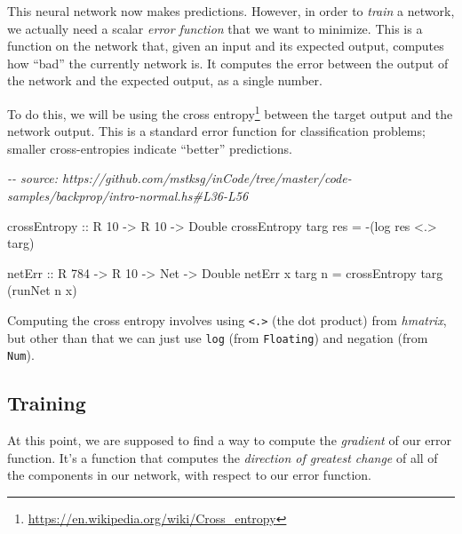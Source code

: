 \documentclass[]{article}
\newenvironment{Shaded}{}{}
\newcommand{\CommentTok}[1]{\textcolor[rgb]{0.38,0.63,0.69}{\textit{#1}}}
\newcommand{\DataTypeTok}[1]{\textcolor[rgb]{0.56,0.13,0.00}{#1}}
\newcommand{\DecValTok}[1]{\textcolor[rgb]{0.25,0.63,0.44}{#1}}
\newcommand{\FunctionTok}[1]{\textcolor[rgb]{0.02,0.16,0.49}{#1}}
\newcommand{\NormalTok}[1]{#1}
\newcommand{\OperatorTok}[1]{\textcolor[rgb]{0.40,0.40,0.40}{#1}}
\newcommand{\OtherTok}[1]{\textcolor[rgb]{0.00,0.44,0.13}{#1}}
\renewcommand{\href}[2]{#2\footnote{\url{#1}}}
\begin{document}
This neural network now makes predictions. However, in order to \emph{train} a
network, we actually need a scalar \emph{error function} that we want to
minimize. This is a function on the network that, given an input and its
expected output, computes how ``bad'' the currently network is. It computes the
error between the output of the network and the expected output, as a single
number.

To do this, we will be using the
\href{https://en.wikipedia.org/wiki/Cross_entropy}{cross entropy} between the
target output and the network output. This is a standard error function for
classification problems; smaller cross-entropies indicate ``better''
predictions.

\begin{Shaded}
\begin{Highlighting}[]
\CommentTok{{-}{-} source: https://github.com/mstksg/inCode/tree/master/code{-}samples/backprop/intro{-}normal.hs\#L36{-}L56}

\NormalTok{crossEntropy}
\OtherTok{    ::} \DataTypeTok{R} \DecValTok{10}
    \OtherTok{{-}\textgreater{}} \DataTypeTok{R} \DecValTok{10}
    \OtherTok{{-}\textgreater{}} \DataTypeTok{Double}
\NormalTok{crossEntropy targ res }\OtherTok{=} \OperatorTok{{-}}\NormalTok{(}\FunctionTok{log}\NormalTok{ res }\OperatorTok{\textless{}.\textgreater{}}\NormalTok{ targ)}

\NormalTok{netErr}
\OtherTok{    ::} \DataTypeTok{R} \DecValTok{784}
    \OtherTok{{-}\textgreater{}} \DataTypeTok{R} \DecValTok{10}
    \OtherTok{{-}\textgreater{}} \DataTypeTok{Net}
    \OtherTok{{-}\textgreater{}} \DataTypeTok{Double}
\NormalTok{netErr x targ n }\OtherTok{=}\NormalTok{ crossEntropy targ (runNet n x)}
\end{Highlighting}
\end{Shaded}

Computing the cross entropy involves using \texttt{\textless{}.\textgreater{}}
(the dot product) from \emph{hmatrix}, but other than that we can just use
\texttt{log} (from \texttt{Floating}) and negation (from \texttt{Num}).

\subsection{Training}\label{training}

At this point, we are supposed to find a way to compute the \emph{gradient} of
our error function. It's a function that computes the \emph{direction of
greatest change} of all of the components in our network, with respect to our
error function.
\end{document}

